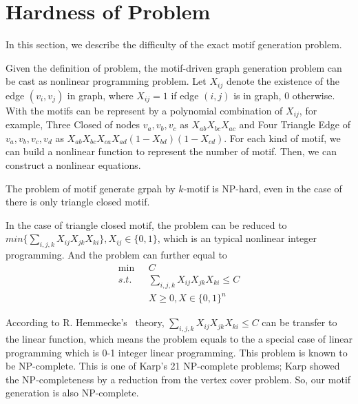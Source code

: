 \section{Hardness of Problem}
\label{sec:nphard}

In this section, we describe the difficulty of the exact motif generation problem.


Given the definition of problem, the motif-driven graph generation problem can be cast as nonlinear programming problem. Let $X_{ij}$ denote the existence of the edge $(v_i, v_j)$ in graph, where $X_{ij} = 1$ if edge $(i, j)$ is in graph, $0$ otherwise. With the motifs can be represent by a polynomial combination of $X_{ij}$, for example, Three Closed of nodes $v_a, v_b, v_c$ as $X_{ab}X_{bc}X_{ac}$ and Four Triangle Edge of $v_a, v_b, v_c, v_d$ as $X_{ab}X_{bc}X_{ca}X_{ad}(1 - X_{bd})(1 - X_{cd})$. For each kind of motif, we can build a nonlinear function to represent the number of motif. Then, we can construct a nonlinear equations.

\theorem The problem of motif generate grpah by $k$-motif is NP-hard, even in the case of there is only triangle closed motif.

\Proof In the case of triangle closed motif, the problem can be reduced to $min\{\sum_{i,j,k} X_{ij}X_{jk}X_{ki}\}, X_{ij} \in \{0, 1\}$, which is an typical nonlinear integer programming. And the problem can further equal to
\begin{align*}
\min\mbox{ }&C\\
s.t. &\sum_{i,j,k} X_{ij}X_{jk}X_{ki} \leq C\\
&X \geq 0, X \in \{0, 1\}^n
\end{align*}

According to R. Hemmecke's~\cite{hemmecke2009nonlinear} theory, $\sum_{i,j,k} X_{ij}X_{jk}X_{ki} \leq C$ can be transfer to the linear function, which means the problem equals to the a special case of  linear programming which is 0-1 integer linear programming. This problem is known to be NP-complete. This is one of Karp's 21 NP-complete problems; \cite{karp1972reducibility} Karp showed the NP-completeness by a reduction from the vertex cover problem. So, our motif generation is also NP-complete.
